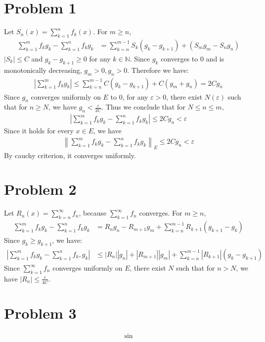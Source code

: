 \documentclass{report}
\def\ve{\varepsilon}
\begin{document}
    \section*{Problem 1}
    Let $S_n(x) = \sum_{k=1}^n f_k(x)$. For $m \ge n$,
    \begin{align*}
        \sum_{k=1}^m f_k g_k - \sum_{k=1}^n f_k g_k &= \sum_{k=n}^{m-1}S_k(g_k-g_{k+1})
            + (S_m g_m - S_n g_n) 
    \end{align*}
    $|S_k| \le C$ and $g_k - g_{k+1} \ge 0$ for any $k \in \mathbb{N}$. 
    Since $g_k$ converges to 0 and is monotonically decreasing, $g_m > 0, g_n > 0$. 
    Therefore we have:
    \begin{align*}
        \left| \sum_{k=1}^m f_k g_k\right| \le \sum_{k=n}^{m-1} C (g_k-g_{k+1}) + 
            C(g_m + g_n) = 2Cg_n
    \end{align*}
    Since $g_n$ converges uniformly on $E$ to 0, for any $\varepsilon > 0$, there 
    exist $N(\varepsilon)$ such that for $n \ge N$, we have $g_n<\frac{\varepsilon}{2C}$.
    Thus we conclude that for $N \le n \le m$, 
    \begin{align*}
        \left| \sum_{k=1}^m f_k g_k - \sum_{k=1}^n f_k g_k\right| \le 2Cg_n < \varepsilon
    \end{align*}
    Since it holds for every $x \in E$, we have 
    \begin{align*}
        \left\| \sum_{k=1}^m f_k g_k-\sum_{k=1}^n f_k g_k \right\|_E \le 2Cg_n < \ve
    \end{align*}
    By cauchy criterion, it converges uniformly.
    
    \section*{Problem 2}
    Let $R_n(x) = \sum_{k=n}^\infty f_n$, because $\sum_{k=1}^\infty f_n$ converges.
    For $m \ge n$,
    \begin{align*}
        \sum_{k=1}^m f_k g_k - \sum_{k=1}^n f_k g_k &= 
            R_n g_n - R_{m+1} g_m + \sum_{k=n}^{m-1}R_{k+1} (g_{k+1} - g_k)
    \end{align*}
    Since $g_{k} \ge g_{k+1}$, we have:
    \begin{align*}
        \left| \sum_{k=1}^m f_k g_k - \sum_{k=1}^n f_k, g_k \right| &\le
            |R_n| |g_n| + |R_{m+1}| |g_m| + \sum_{k=n}^{m-1} |R_{k+1}| (g_k - g_{k+1})
    \end{align*}
    Since $\sum_{k=1}^\infty f_n$ converges uniformly on $E$, there exist $N$ such that
    for $n > N$, we have $|R_n| \le \frac{\ve}{4C}$.
    \section*{Problem 3}
    \begin{align*}
        \sin 
    \end{align*}
\end{document}
